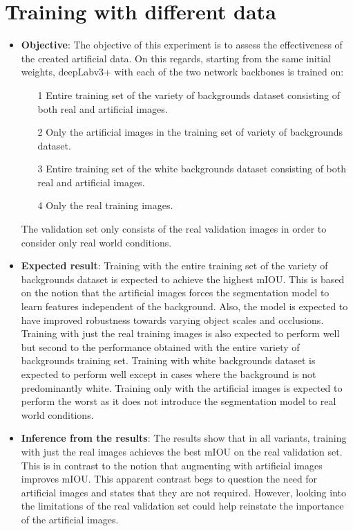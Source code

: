 \section{Training with different data}

	\begin{itemize}
		\item \textbf{Objective}: The objective of this experiment is to assess the effectiveness of the created artificial data. On this regards, starting from the same initial weights, deepLabv3+ with each of the two network backbones is trained on:
		\begin{itemize}
			\item[1] Entire training set of the variety of backgrounds dataset consisting of both real and artificial images.
			\item[2] Only the artificial images in the training set of variety of backgrounds dataset.
			\item[3] Entire training set of the white backgrounds dataset consisting of both real and artificial images.
			\item[4] Only the real training images.
		\end{itemize}
	The validation set only consists of the real validation images in order to consider only real world conditions.
		\item \textbf{Expected result}: Training with the entire training set of the variety of backgrounds dataset is expected to achieve the highest mIOU. This is based on the notion that the artificial images forces the segmentation model to learn features independent of the background. Also, the model is expected to have improved robustness towards varying object scales and occlusions. Training with just the real training images is also expected to perform well but second to the performance obtained with the entire variety of backgrounds training set. Training with white backgrounds dataset is expected to perform well except in cases where the background is not predominantly white. Training only with the artificial images is expected to perform the worst as it does not introduce the segmentation model to real world conditions.
		\item \textbf{Inference from the results}: The results show that in all variants, training with just the real images achieves the best mIOU on the real validation set. This is in contrast to the notion that augmenting with artificial images improves mIOU. This apparent contrast begs to question the need for artificial images and states that they are not required. However, looking into the limitations of the real validation set could help reinstate the importance of the artificial images.

\end{itemize}
